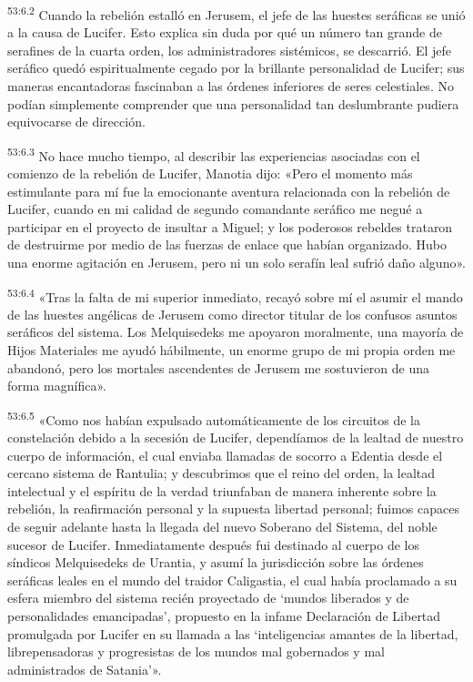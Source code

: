 \par
\textsuperscript{53:6.2} Cuando la rebelión estalló en Jerusem, el jefe de las huestes seráficas se unió a la causa de Lucifer. Esto explica sin duda por qué un número tan grande de serafines de la cuarta orden, los administradores sistémicos, se descarrió. El jefe seráfico quedó espiritualmente cegado por la brillante personalidad de Lucifer; sus maneras encantadoras fascinaban a las órdenes inferiores de seres celestiales. No podían simplemente comprender que una personalidad tan deslumbrante pudiera equivocarse de dirección.

\par
\textsuperscript{53:6.3} No hace mucho tiempo, al describir las experiencias asociadas con el comienzo de la rebelión de Lucifer, Manotia dijo: «Pero el momento más estimulante para mí fue la emocionante aventura relacionada con la rebelión de Lucifer, cuando en mi calidad de segundo comandante seráfico me negué a participar en el proyecto de insultar a Miguel; y los poderosos rebeldes trataron de destruirme por medio de las fuerzas de enlace que habían organizado. Hubo una enorme agitación en Jerusem, pero ni un solo serafín leal sufrió daño alguno».

\par
\textsuperscript{53:6.4} «Tras la falta de mi superior inmediato, recayó sobre mí el asumir el mando de las huestes angélicas de Jerusem como director titular de los confusos asuntos seráficos del sistema. Los Melquisedeks me apoyaron moralmente, una mayoría de Hijos Materiales me ayudó hábilmente, un enorme grupo de mi propia orden me abandonó, pero los mortales ascendentes de Jerusem me sostuvieron de una forma magnífica».

\par
\textsuperscript{53:6.5} «Como nos habían expulsado automáticamente de los circuitos de la constelación debido a la secesión de Lucifer, dependíamos de la lealtad de nuestro cuerpo de información, el cual enviaba llamadas de socorro a Edentia desde el cercano sistema de Rantulia; y descubrimos que el reino del orden, la lealtad intelectual y el espíritu de la verdad triunfaban de manera inherente sobre la rebelión, la reafirmación personal y la supuesta libertad personal; fuimos capaces de seguir adelante hasta la llegada del nuevo Soberano del Sistema, del noble sucesor de Lucifer. Inmediatamente después fui destinado al cuerpo de los síndicos Melquisedeks de Urantia, y asumí la jurisdicción sobre las órdenes seráficas leales en el mundo del traidor Caligastia, el cual había proclamado a su esfera miembro del sistema recién proyectado de `mundos liberados y de personalidades emancipadas', propuesto en la infame Declaración de Libertad promulgada por Lucifer en su llamada a las `inteligencias amantes de la libertad, librepensadoras y progresistas de los mundos mal gobernados y mal administrados de Satania'».


